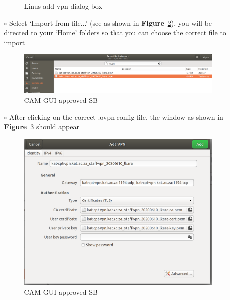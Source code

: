 \begin{itemize}
\begin{itemize}
\begin{figure}[H]
	\caption{Linus add vpn dialog box}
	\label{fig:image2}
\end{figure}

\item[$\circ$] Select ‘Import from file...’ (see as shown in \textbf{Figure}~\ref{fig:image130}), you will be directed to your ‘Home’ folders so that you can choose the correct file to import
\begin{figure}[!thb]
	\centering
	\includegraphics[scale=0.18]{Chapters/images/image130.png}
	
	\caption{CAM GUI approved SB }
	\label{fig:image130}
\end{figure}


\item[$\circ$] After clicking on the correct .ovpn config file, the window as shown in \textbf{Figure}~\ref{fig:image112} should appear

\begin{figure}[!thb]
	\centering
	\includegraphics[scale=0.25]{Chapters/images/image112.png}
	
	\caption{CAM GUI approved SB }
	\label{fig:image112}
\end{figure}


\end{itemize}
\end{itemize}
